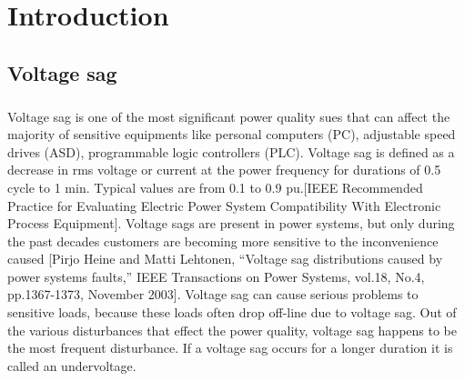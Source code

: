 \documentclass[17pt, a4paper]{extreport}
\begin{document}
\chapter[Introduction]{Introduction}
\section[Voltage sag]{Voltage sag}
\paragraph{}
Voltage sag is one of the most significant power quality sues that can affect the majority of sensitive equipments like personal computers (PC), adjustable speed drives (ASD), programmable logic controllers (PLC). Voltage sag is defined as a decrease in rms voltage or current at the power frequency for durations of 0.5 cycle to 1 min. Typical values are from 0.1 to 0.9 pu.[IEEE Recommended Practice for Evaluating Electric Power System Compatibility With Electronic Process Equipment]. Voltage sags are present in power systems, but only during the past decades customers are becoming more sensitive to the inconvenience caused [Pirjo Heine and Matti Lehtonen, “Voltage sag distributions caused by power systems faults,” IEEE Transactions on Power Systems, vol.18, No.4, pp.1367-1373, November 2003]. Voltage sag can cause serious problems to sensitive loads, because these loads often drop off-line due to voltage sag. Out of the various disturbances that effect the power quality, voltage sag happens to be the most frequent disturbance. If a voltage sag occurs for a longer duration it is called an undervoltage. 
\end{document}
